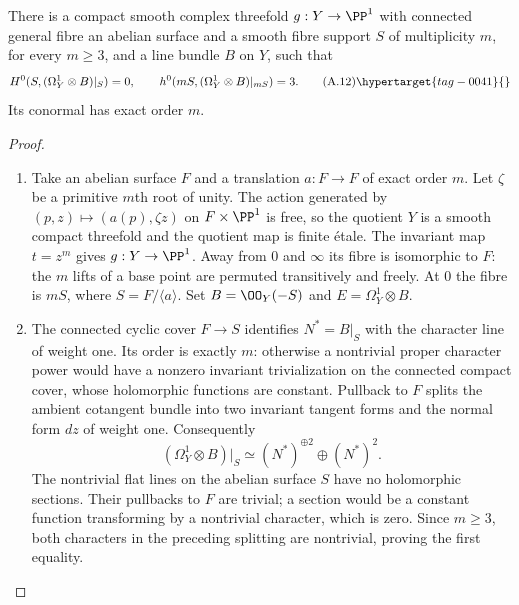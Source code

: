 \begin{proposition}\hypertarget{tag-01AM}{}\label{cdp:st:A.3.2}

There is a compact smooth complex threefold $g:Y\to\PP^1$ with connected general fibre an abelian surface and a smooth fibre support $S$ of multiplicity $m$, for every $m\ge3$, and a line bundle $B$ on $Y$, such that
\[
H^0(S,(\Omega_Y^1\otimes B)|_S)=0,
\qquad h^0(mS,(\Omega_Y^1\otimes B)|_{mS})=3.
\tag{A.12}\hypertarget{tag-0041}{}\label{cdp:eq:A.12}
\]
Its conormal has exact order $m$.
\end{proposition}


\begin{proof}

\begin{enumerate}[label=\arabic*.,leftmargin=*]
\item Take an abelian surface $F$ and a translation $a:F\to F$ of exact order $m$. Let $\zeta$ be a primitive $m$th root of unity. The action generated by $(p,z)\mapsto(a(p),\zeta z)$ on $F\times\PP^1$ is free, so the quotient $Y$ is a smooth compact threefold and the quotient map is finite \'etale. The invariant map $t=z^m$ gives $g:Y\to\PP^1$. Away from $0$ and $\infty$ its fibre is isomorphic to $F$: the $m$ lifts of a base point are permuted transitively and freely. At $0$ the fibre is $mS$, where $S=F/\langle a\rangle$. Set $B=\OO_Y(-S)$ and $E=\Omega_Y^1\otimes B$.

\item The connected cyclic cover $F\to S$ identifies $N^*=B|_S$ with the character line of weight one. Its order is exactly $m$: otherwise a nontrivial proper character power would have a nonzero invariant trivialization on the connected compact cover, whose holomorphic functions are constant. Pullback to $F$ splits the ambient cotangent bundle into two invariant tangent forms and the normal form $dz$ of weight one. Consequently
\[
 (\Omega_Y^1\otimes B)|_S\simeq (N^*)^{\oplus2}\oplus(N^*)^2.
\]
The nontrivial flat lines on the abelian surface $S$ have no holomorphic sections. Their pullbacks to $F$ are trivial; a section would be a constant function transforming by a nontrivial character, which is zero. Since $m\ge3$, both characters in the preceding splitting are nontrivial, proving the first equality.


\end{enumerate}
\end{proof}
